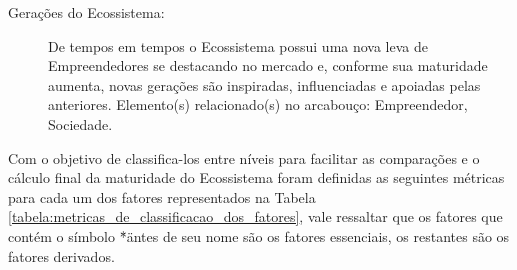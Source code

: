 \begin{description}
  \item [Gerações do Ecossistema:] De tempos em tempos o Ecossistema possui uma nova leva de Empreendedores se destacando no mercado e, conforme sua maturidade aumenta, novas gerações são inspiradas, influenciadas e apoiadas pelas anteriores. Elemento(s) relacionado(s) no arcabouço: Empreendedor, Sociedade.       
\end{description}

Com o objetivo de classifica-los entre níveis para facilitar as comparações e o cálculo final da maturidade do Ecossistema foram definidas as seguintes métricas para cada um dos fatores representados na Tabela \ref{tabela:metricas_de_classificacao_dos_fatores}, vale ressaltar que os fatores que contém o símbolo \"*\" antes de seu nome são os fatores essenciais, os restantes são os fatores derivados.

